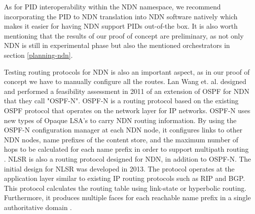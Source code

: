 As for PID interoperability within the NDN namespace, we recommend incorporating the PID to NDN translation into NDN software natively which makes it easier for having NDN support PIDs out-of-the box. It is also worth mentioning that the results of our proof of concept are preliminary, as not only NDN is still in experimental phase but also the mentioned orchestrators in section \ref{planning-ndn}.
 
Testing routing protocols for NDN is also an important aspect, as in our proof of concept we have to manually configure all the routes. Lan Wang et. al. \cite{ndn-ospfn1} designed and performed a feasibility assessment in 2011 of an extension of OSPF for NDN that they call "OSPF-N". OSPF-N is a routing protocol based on the existing OSPF protocol that operates on the network layer for IP networks. OSPF-N uses new types of Opaque LSA's to carry NDN routing information. By using the OSPF-N configuration manager at each NDN node, it configures links to other NDN nodes, name prefixes of the content store, and the maximum number of hops to be calculated for each name prefix in order to support multipath routing \cite{ndn-ospfn2}. 
NLSR is also a routing protocol designed for NDN, in addition to OSPF-N. 
The initial design for NLSR was developed in 2013. The protocol operates at the application layer similar to existing IP routing protocols such as RIP and BGP. This protocol calculates the routing table using link-state or hyperbolic routing. Furthermore, it produces multiple faces for each reachable name prefix in a single authoritative domain \cite{nlsr}. 





